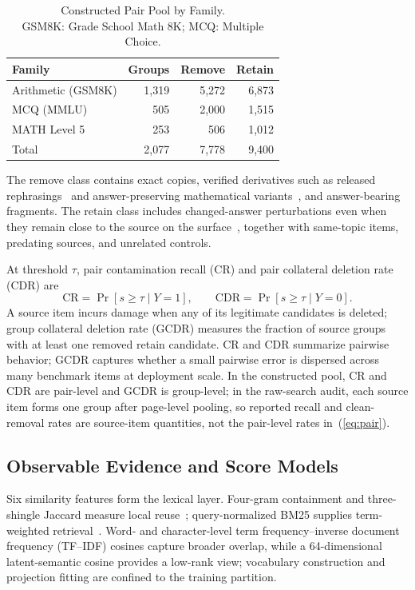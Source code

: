 \documentclass[conference]{IEEEtran}
\begin{document}
\begin{table}[t]
\caption{Constructed Pair Pool by Family.\\GSM8K: Grade School Math 8K; MCQ: Multiple Choice.}
\label{tab:pool}
\centering
\begin{tabular}{lrrr}
\toprule
Family & Groups & Remove & Retain\\
\midrule
Arithmetic (GSM8K) & 1,319 & 5,272 & 6,873\\
MCQ (MMLU) & 505 & 2,000 & 1,515\\
MATH Level 5 & 253 & 506 & 1,012\\
\midrule
Total & 2,077 & 7,778 & 9,400\\
\bottomrule
\end{tabular}
\end{table}

The remove class contains exact copies, verified derivatives such as released rephrasings~\cite{yang2023} and answer-preserving mathematical variants~\cite{li2024gsmplus}, and answer-bearing fragments. The retain class includes changed-answer perturbations even when they remain close to the source on the surface~\cite{mirzadeh2024}, together with same-topic items, predating sources, and unrelated controls.

At threshold $\tau$, pair contamination recall (CR) and pair collateral deletion rate (CDR) are
\begin{equation}
\mathrm{CR}=\Pr[s\ge\tau\mid Y=1],\qquad \mathrm{CDR}=\Pr[s\ge\tau\mid Y=0].
\label{eq:pair}
\end{equation}
A source item incurs damage when any of its legitimate candidates is deleted; group collateral deletion rate (GCDR) measures the fraction of source groups with at least one removed retain candidate. CR and CDR summarize pairwise behavior; GCDR captures whether a small pairwise error is dispersed across many benchmark items at deployment scale. In the constructed pool, CR and CDR are pair-level and GCDR is group-level; in the raw-search audit, each source item forms one group after page-level pooling, so reported recall and clean-removal rates are source-item quantities, not the pair-level rates in~(\ref{eq:pair}).

\subsection{Observable Evidence and Score Models}
Six similarity features form the lexical layer. Four-gram containment and three-shingle Jaccard measure local reuse~\cite{broder1997}; query-normalized BM25 supplies term-weighted retrieval~\cite{robertson2009}. Word- and character-level term frequency--inverse document frequency (TF--IDF) cosines capture broader overlap, while a 64-dimensional latent-semantic cosine provides a low-rank view; vocabulary construction and projection fitting are confined to the training partition.
\end{document}
